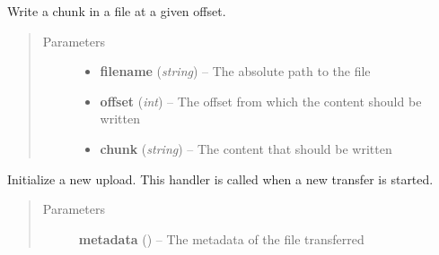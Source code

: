 \documentclass[letterpaper,10pt,english]{sphinxmanual}
\begin{document}

\begin{fulllineitems}
\label{drivers:upload_chunk}
Write a chunk in a file at a given offset.
\begin{quote}\begin{description}
\item[{Parameters}] \leavevmode\begin{itemize}
\item {} 
\textbf{filename} (\emph{string}) -- The absolute path to the file

\item {} 
\textbf{offset} (\emph{int}) -- The offset from which the content should be written

\item {} 
\textbf{chunk} (\emph{string}) -- The content that should be written

\end{itemize}

\end{description}\end{quote}

\end{fulllineitems}


\begin{fulllineitems}
\label{drivers:start_upload}
Initialize a new upload. This handler is called when a new transfer is started.
\begin{quote}\begin{description}
\item[{Parameters}] \leavevmode
\textbf{metadata} ({\hyperref[drivers:onitu.api.metadata.Metadata]{}}) -- The metadata of the file transferred

\end{description}\end{quote}

\end{fulllineitems}

\end{document}
